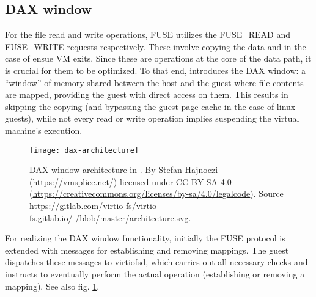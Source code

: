 
\subsection{DAX window}

For the file read and write operations, FUSE utilizes the FUSE\_READ and
FUSE\_WRITE requests respectively. These involve copying the data and in the
case of \viofs{} ensue VM exits. Since these are operations at the core of the
data path, it is crucial for them to be optimized. To that end, \viofs{}
introduces the DAX window: a ``window'' of memory shared between the host and
the guest where file contents are mapped, providing the guest with direct access
on them. This results in skipping the copying (and bypassing the guest page
cache in the case of linux guests), while not every read or write operation
implies suspending the virtual machine's execution.

\begin{figure}
    \centering
    \texttt{[image: dax-architecture]}
    \caption[DAX window architecture in \viofs{}]{DAX window architecture in
        \viofs{}. By Stefan Hajnoczi (\url{https://vmsplice.net/}) licensed
        under CC-BY-SA 4.0
        (\url{https://creativecommons.org/licenses/by-sa/4.0/legalcode}).
        Source
        \url{https://gitlab.com/virtio-fs/virtio-fs.gitlab.io/-/blob/master/architecture.svg}.}
    \label{fig:dax-architecture}
\end{figure}


For realizing the DAX window functionality, initially the FUSE protocol is
extended with messages for establishing and removing mappings. The guest
dispatches these messages to virtiofsd, which carries out all necessary checks
and instructs \qemu{} to eventually perform the actual operation (establishing
or removing a mapping). See also fig. \ref{fig:dax-architecture}.
